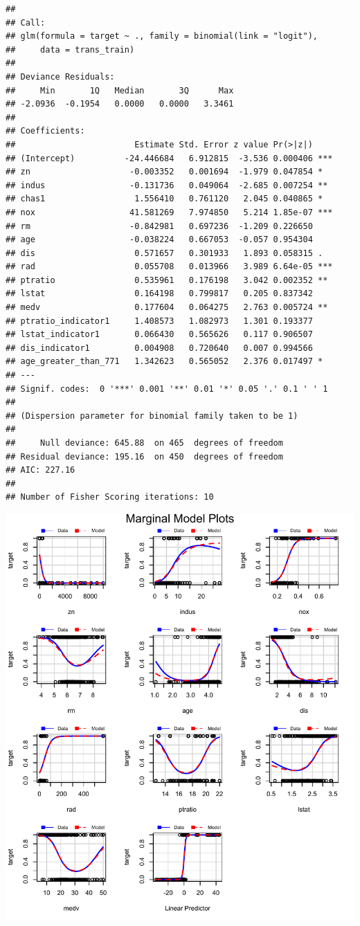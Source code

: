 \documentclass[3p]{elsarticle} %
\begin{document}
\begin{verbatim}
## 
## Call:
## glm(formula = target ~ ., family = binomial(link = "logit"), 
##     data = trans_train)
## 
## Deviance Residuals: 
##     Min       1Q   Median       3Q      Max  
## -2.0936  -0.1954   0.0000   0.0000   3.3461  
## 
## Coefficients:
##                        Estimate Std. Error z value Pr(>|z|)    
## (Intercept)          -24.446684   6.912815  -3.536 0.000406 ***
## zn                    -0.003352   0.001694  -1.979 0.047854 *  
## indus                 -0.131736   0.049064  -2.685 0.007254 ** 
## chas1                  1.556410   0.761120   2.045 0.040865 *  
## nox                   41.581269   7.974850   5.214 1.85e-07 ***
## rm                    -0.842981   0.697236  -1.209 0.226650    
## age                   -0.038224   0.667053  -0.057 0.954304    
## dis                    0.571657   0.301933   1.893 0.058315 .  
## rad                    0.055708   0.013966   3.989 6.64e-05 ***
## ptratio                0.535961   0.176198   3.042 0.002352 ** 
## lstat                  0.164198   0.799817   0.205 0.837342    
## medv                   0.177604   0.064275   2.763 0.005724 ** 
## ptratio_indicator1     1.408573   1.082973   1.301 0.193377    
## lstat_indicator1       0.066430   0.565626   0.117 0.906507    
## dis_indicator1         0.004908   0.720640   0.007 0.994566    
## age_greater_than_771   1.342623   0.565052   2.376 0.017497 *  
## ---
## Signif. codes:  0 '***' 0.001 '**' 0.01 '*' 0.05 '.' 0.1 ' ' 1
## 
## (Dispersion parameter for binomial family taken to be 1)
## 
##     Null deviance: 645.88  on 465  degrees of freedom
## Residual deviance: 195.16  on 450  degrees of freedom
## AIC: 227.16
## 
## Number of Fisher Scoring iterations: 10
\end{verbatim}

\includegraphics{paper_files/figure-latex/unnamed-chunk-17-1.pdf}
\end{document}
